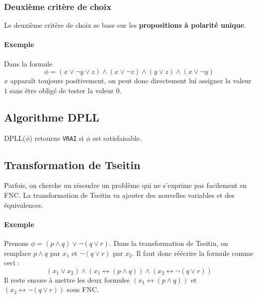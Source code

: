 \documentclass[a4paper]{article}
\begin{document}
  \subsubsection{Deuxième critère de choix}
  Le deuxième critère de choix se base sur les \textbf{propositions à polarité unique}.

  \paragraph{Exemple} Dans la formule 
  $$\phi = (x \lor \lnot y \lor z) \land (x \lor \lnot z) \land (y \lor z) \land (x \lor \lnot y) $$
  $x$ apparaît toujours positivement, on peut donc directement lui assigner la valeur $1$
  sans être obligé de tester la valeur $0$.

  \subsection{Algorithme DPLL}
  DPLL($\phi$) retourne \texttt{VRAI} si $\phi$ est satisfaisable.

  \begin{algorithm}[H]
  \end{algorithm}

  \subsection{Transformation de Tseitin}
  Parfois, on cherche un résoudre un problème qui ne s'exprime pas facilement en FNC.
  La transformation de Tseitin va ajouter des nouvelles variables et des équivalences.

    \paragraph{Exemple} Prenons $ \phi = (p \land q) \lor \lnot (q \lor r) $. Dans 
    la transformation de Tseitin, on remplace $p \land q$ par $x_1$ et $\lnot (q \lor r)$ par $x_2$.
    Il faut donc réécrire la formule comme ceci :
    $$ (x_1 \lor x_2) \land (x_1 \leftrightarrow (p \land q)) \land (x_2 \leftrightarrow \lnot (q \lor r) )$$
    Il reste encore à mettre les deux formules $(x_1 \leftrightarrow (p \land q))$ et $(x_2 \leftrightarrow \lnot (q \lor r))$ sous FNC.\\
\end{document}
